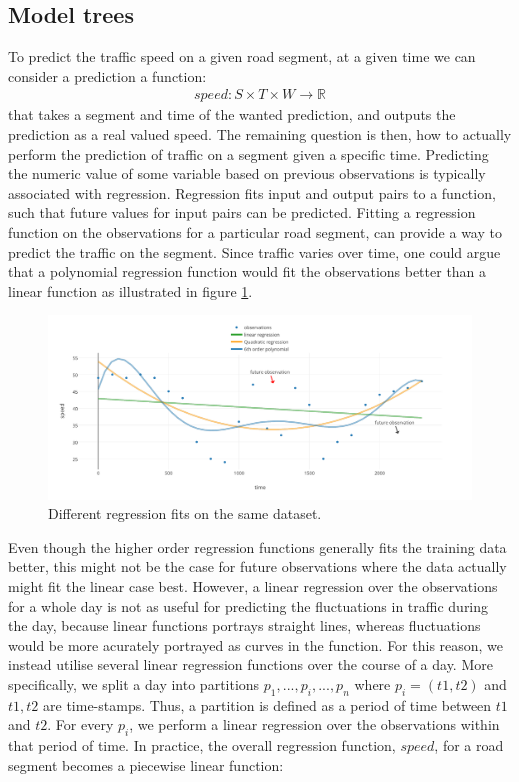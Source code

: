 \subsection{Model trees}\label{patterns:model-trees}
To predict the traffic speed on a given road segment, at a given time we can consider a prediction a function:
\begin{align*}
speed: S \times T \times W \rightarrow \mathbb{R}
\end{align*}
that takes a segment and time of the wanted prediction, and outputs the prediction as a real valued speed. The remaining question is then, how to actually perform the prediction of traffic on a segment given a specific time.
Predicting the numeric value of some variable based on previous observations is typically associated with regression. Regression fits input and output pairs to a function, such that future values for input pairs can be predicted. Fitting a regression function on the observations for a particular road segment, can provide a way to predict the traffic on the segment. Since traffic varies over time, one could argue that a polynomial regression function would fit the observations better than a linear function as illustrated in figure \ref{fig:compare-regression}.
\begin{figure}
\label{fig:compare-regression}
\includegraphics[width=\textwidth]{figures/compare-regression.pdf}
\caption{Different regression fits on the same dataset.}
\end{figure}
Even though the higher order regression functions generally fits the training data better, this might not be the case for future observations where the data actually might fit the linear case best. However, a linear regression over the observations for a whole day is not as useful for predicting the fluctuations in traffic during the day, because linear functions portrays straight lines, whereas fluctuations would be more acurately portrayed as curves in the function. For this reason, we instead utilise several linear regression functions over the course of a day. More specifically, we split a day  into partitions $p_1,...,p_i,...,p_n$ where $p_i = (t1,t2)$ and $t1,t2$ are time-stamps. Thus, a partition is defined as a period of time between $t1$ and $t2$. For every $p_i$, we perform a linear regression over the observations within that period of time. In practice, the overall regression function, $speed$, for a road segment becomes a piecewise linear function:
